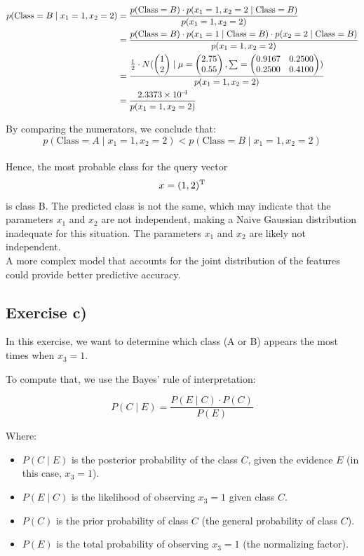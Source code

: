 \documentclass{article}
\begin{document}
\begin{align*}
    p(\text{Class} = B \mid x_1 = 1, x_2 = 2) 
    &= \frac{p(\text{Class} = B) \cdot p(x_1 = 1, x_2 = 2 \mid \text{Class} = B)}{p(x_1 = 1, x_2 = 2)} \\
    &= \frac{p(\text{Class} = B) \cdot p(x_1 = 1 \mid \text{Class} = B) \cdot p(x_2 = 2 \mid \text{Class} = B)}{p(x_1 = 1, x_2 = 2)} \\
    &= \frac{\frac{1}{2} \cdot N(
        \begin{pmatrix}1 \\ 2\end{pmatrix} \mid
        \mu = \begin{pmatrix}2.75 \\ 0.55\end{pmatrix},
        \sum = \begin{pmatrix}0.9167 & 0.2500 \\ 0.2500 & 0.4100 \end{pmatrix}
    )}{p(x_1 = 1, x_2 = 2)} \\
    &= \frac{2.3373\times10\textsuperscript{-4}}{p(x_1 = 1, x_2 = 2)}
\end{align*}

By comparing the numerators, we conclude that:
$$p(\text{Class} = A \mid x_1 = 1, x_2 = 2) < p(\text{Class} = B \mid x_1 = 1, x_2 = 2)$$
\\
Hence, the most probable class for the query vector $$x = (1, 2)\textsuperscript{T}$$ is class B.
The predicted class is not the same, which may indicate that the parameters \(x_1\) and \(x_2\) are not independent, making a Naive Gaussian distribution inadequate for this situation.
The parameters \(x_1\) and \(x_2\) are likely not independent.
\\
A more complex model that accounts for the joint distribution of the features could provide better predictive accuracy.

\subsection{Exercise c)}
In this exercise, we want to determine which class (A or B) appears the most times when \( x_3 = 1 \).

To compute that, we use the Bayes' rule of interpretation:

\[
P(C \mid E) = \frac{P(E \mid C) \cdot P(C)}{P(E)}
\]

Where:
\begin{itemize}
    \item \( P(C \mid E) \) is the posterior probability of the class \( C \), given the evidence \( E \) (in this case, \( x_3 = 1 \)).
    \item \( P(E \mid C) \) is the likelihood of observing \( x_3 = 1 \) given class \( C \).
    \item \( P(C) \) is the prior probability of class \( C \) (the general probability of class \( C \)).
    \item \( P(E) \) is the total probability of observing \( x_3 = 1 \) (the normalizing factor).
\end{itemize}
\end{document}
